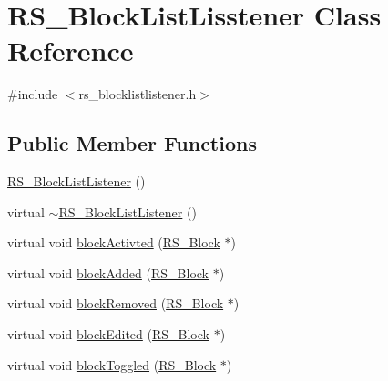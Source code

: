 \hypertarget{class_r_s___block_list_lisstener}{\section{R\-S\-\_\-\-Block\-List\-Lisstener Class Reference}
\label{class_r_s___block_list_lisstener}
}


{\ttfamily \#include $<$rs\-\_\-blocklistlistener.\-h$>$}

\subsection*{Public Member Functions}
\begin{DoxyCompactItemize}
\item 
\hyperlink{class_r_s___block_list_lisstener_ae3b38c859ab5f58bd431411238d9ab40}{R\-S\-\_\-\-Block\-List\-Listener} ()
\item 
virtual \hyperlink{class_r_s___block_list_lisstener_a7c94f65be184217e746efe142a1820ec}{$\sim$\-R\-S\-\_\-\-Block\-List\-Listener} ()
\item 
virtual void \hyperlink{class_r_s___block_list_lisstener_a6d2a6917684d0fb3408b3739886e9d65}{block\-Activted} (\hyperlink{class_r_s___block}{R\-S\-\_\-\-Block} $\ast$)
\item 
virtual void \hyperlink{class_r_s___block_list_lisstener_a69ebaa0c6ca9aab4cbc9adf0f6110edd}{block\-Added} (\hyperlink{class_r_s___block}{R\-S\-\_\-\-Block} $\ast$)
\item 
virtual void \hyperlink{class_r_s___block_list_lisstener_a9046786fc3fbfd1be1d31692dc6c89b6}{block\-Removed} (\hyperlink{class_r_s___block}{R\-S\-\_\-\-Block} $\ast$)
\item 
virtual void \hyperlink{class_r_s___block_list_lisstener_aab83752b9113ece1232f300034d655f9}{block\-Edited} (\hyperlink{class_r_s___block}{R\-S\-\_\-\-Block} $\ast$)
\item 
virtual void \hyperlink{class_r_s___block_list_lisstener_aa80bf508c6fcd56bc260ec6b4d93a192}{block\-Toggled} (\hyperlink{class_r_s___block}{R\-S\-\_\-\-Block} $\ast$)
\end{DoxyCompactItemize}


